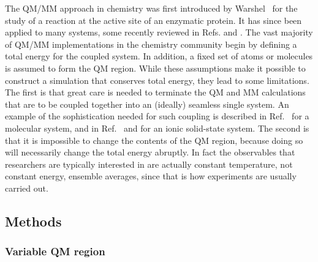 \documentclass[11pt]{revtex4}
\begin{document}
The QM/MM approach in chemistry was first introduced by
Warshel~\cite{warshel_j_mol_biol_1976a} for the study of a reaction
at the active site of an enzymatic protein.  It has since been
applied to many systems, some recently reviewed in
Refs.  and
.  The vast majority of QM/MM
implementations in the chemistry community begin by defining a total
energy for the coupled system.  In addition, a fixed set of atoms
or molecules is assumed to form the QM region.  While these assumptions
make it possible to construct a simulation that conserves total
energy, they lead to some limitations.  The first is that great
care is needed to terminate the QM and MM calculations that are to
be coupled together into an (ideally) seamless single system.  An
example of the sophistication needed for such coupling is described
in Ref.~ for a molecular system, and in
Ref.~ and  for an ionic solid-state
system.  The second is that it is impossible to change the contents
of the QM region, because doing so will necessarily change the total
energy abruptly.  In fact the observables that researchers are typically
interested in are actually constant temperature, not constant energy,
ensemble averages, since that is how experiments are usually carried
out.

\subsection{Methods}

\subsubsection{Variable QM region}
\end{document}

